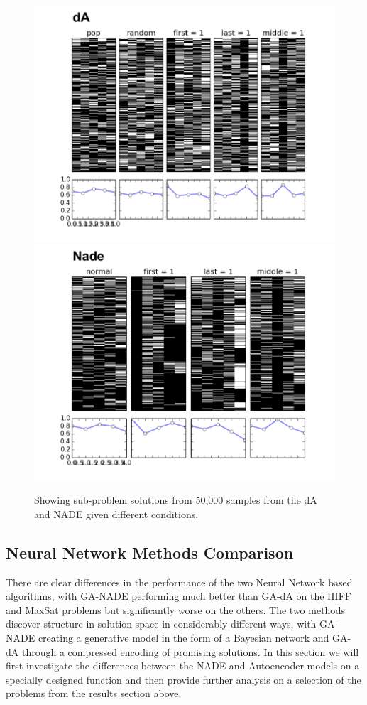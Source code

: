\documentclass[twoside]{article}
\begin{document}
\begin{figure}[t!]
\centering
    \includegraphics[scale=0.7]{da_croad.pdf}
  \includegraphics[scale=0.7]{nade_croad.pdf}
  \caption{Showing sub-problem solutions from 50,000 samples from the dA and NADE given different conditions.}
  \label{fig:nade_vs_da2}
\end{figure}

\subsection{Neural Network Methods Comparison}

There are clear differences in the performance of the two Neural Network based algorithms, with GA-NADE performing much better than GA-dA on the HIFF and MaxSat problems but significantly worse on the others. The two methods discover structure in solution space in considerably different ways, with GA-NADE creating a generative model in the form of a Bayesian network and GA-dA through a compressed encoding of promising solutions. In this section we will first investigate the differences between the NADE and Autoencoder models on a specially designed function and then provide further analysis on a selection of the problems from the results section above.
\end{document}

